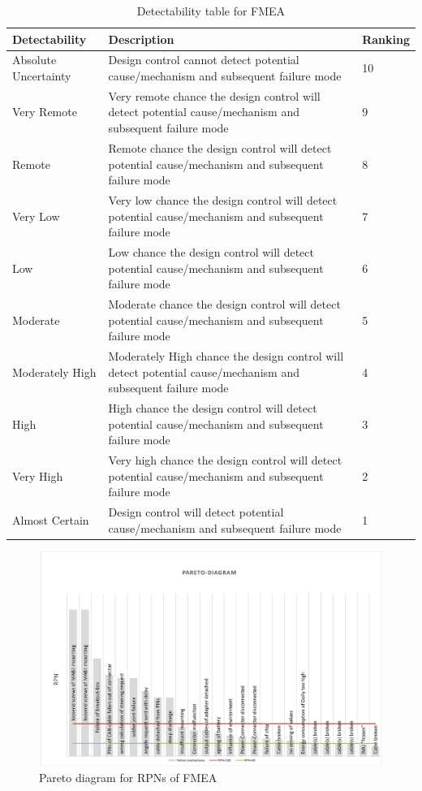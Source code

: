 \documentclass[ExampleMasters.tex]{subfiles}
\begin{document}
\begin{table}[h]
	\centering
	\caption{Detectability table for \gls{FMEA} \cite{FMEA_tables}}
	\label{tab:fmea_detectability}
	\begin{tabular}{p{4cm}|p{9cm}|p{2cm}|}
		Detectability & Description & Ranking   \\ \hline
		Absolute Uncertainty & Design control cannot detect potential cause/mechanism and
		subsequent failure mode & 10        \\
		Very Remote &  Very remote chance the design control will detect potential
		cause/mechanism and subsequent failure mode & 9    \\
		Remote &  Remote chance the design control will detect potential
		cause/mechanism and subsequent failure mode & 8       \\
		Very Low & Very low chance the design control will detect potential
		cause/mechanism and subsequent failure mode & 7   \\
		Low &  Low chance the design control will detect potential
		cause/mechanism and subsequent failure mode & 6  \\
		Moderate & Moderate chance the design control will detect potential
		cause/mechanism and subsequent failure mode & 5  \\
		Moderately High & Moderately High chance the design control will detect
		potential cause/mechanism and subsequent failure mode & 4 \\
	High & High chance the design control will detect potential
	cause/mechanism and subsequent failure mode & 3 \\
	Very High	& Very high chance the design control will detect potential
	cause/mechanism and subsequent failure mode & 2 \\
		Almost Certain & Design control will detect potential cause/mechanism and
		subsequent failure mode & 1 \\
	\end{tabular}	


\end{table}
 
\begin{figure}[!htb]
	\centering
	\includegraphics[width=1.0\linewidth]{figures/Pareto}
	\caption{Pareto diagram for RPNs of FMEA}
	\label{fig:pareto}
\end{figure}
\end{document}

